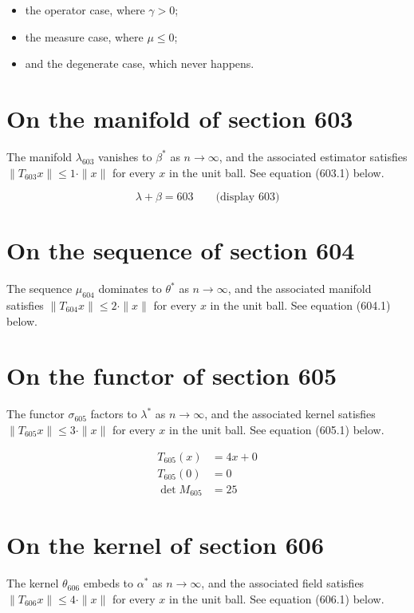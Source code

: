 \documentclass{article}
\begin{document}
\begin{itemize}
  \item the operator case, where $\gamma > 0$;
  \item the measure case, where $\mu \leq 0$;
  \item and the degenerate case, which never happens.
\end{itemize}

\section{On the manifold of section 603}
The manifold $\lambda_{603}$ vanishes to $\beta^{*}$ as $n \to \infty$,
and the associated estimator satisfies $\|T_{603} x\| \leq 1 \cdot \|x\|$
for every $x$ in the unit ball. See equation (603.1) below.

$$
\lambda + \beta = 603 \qquad \text{(display 603)}
$$

\section{On the sequence of section 604}
The sequence $\mu_{604}$ dominates to $\theta^{*}$ as $n \to \infty$,
and the associated manifold satisfies $\|T_{604} x\| \leq 2 \cdot \|x\|$
for every $x$ in the unit ball. See equation (604.1) below.

\section{On the functor of section 605}
The functor $\sigma_{605}$ factors to $\lambda^{*}$ as $n \to \infty$,
and the associated kernel satisfies $\|T_{605} x\| \leq 3 \cdot \|x\|$
for every $x$ in the unit ball. See equation (605.1) below.

\begin{align}
T_{605}(x) &= 4 x + 0 \\
T_{605}(0) &= 0 \\
\det M_{605} &= 25
\end{align}

\section{On the kernel of section 606}
The kernel $\theta_{606}$ embeds to $\alpha^{*}$ as $n \to \infty$,
and the associated field satisfies $\|T_{606} x\| \leq 4 \cdot \|x\|$
for every $x$ in the unit ball. See equation (606.1) below.
\end{document}
